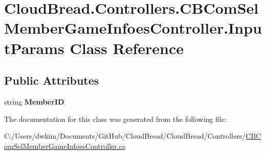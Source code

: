 \hypertarget{class_cloud_bread_1_1_controllers_1_1_c_b_com_sel_member_game_infoes_controller_1_1_input_params}{}\section{Cloud\+Bread.\+Controllers.\+C\+B\+Com\+Sel\+Member\+Game\+Infoes\+Controller.\+Input\+Params Class Reference}
\label{class_cloud_bread_1_1_controllers_1_1_c_b_com_sel_member_game_infoes_controller_1_1_input_params}
\subsection*{Public Attributes}
\begin{DoxyCompactItemize}
\item 
string {\bfseries Member\+ID}\hypertarget{class_cloud_bread_1_1_controllers_1_1_c_b_com_sel_member_game_infoes_controller_1_1_input_params_aafa44f0953da399515aecc1cf9011cc4}{}\label{class_cloud_bread_1_1_controllers_1_1_c_b_com_sel_member_game_infoes_controller_1_1_input_params_aafa44f0953da399515aecc1cf9011cc4}

\end{DoxyCompactItemize}


The documentation for this class was generated from the following file\+:\begin{DoxyCompactItemize}
\item 
C\+:/\+Users/dwkim/\+Documents/\+Git\+Hub/\+Cloud\+Bread/\+Cloud\+Bread/\+Controllers/\hyperlink{_c_b_com_sel_member_game_infoes_controller_8cs}{C\+B\+Com\+Sel\+Member\+Game\+Infoes\+Controller.\+cs}\end{DoxyCompactItemize}
